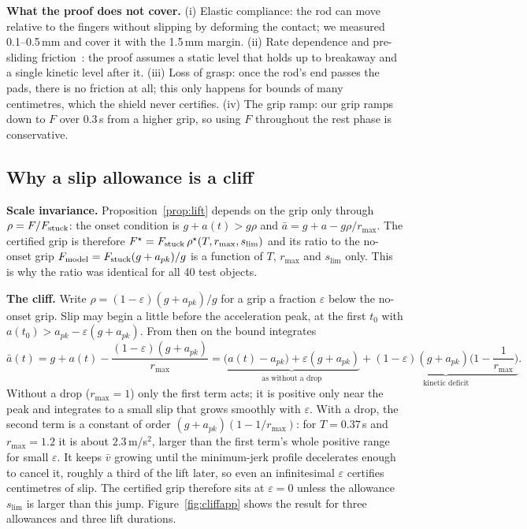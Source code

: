 \textbf{What the proof does not cover.} (i) Elastic compliance: the rod can move relative to the fingers without slipping
by deforming the contact; we measured 0.1--0.5\,mm and cover it with the 1.5\,mm margin. (ii) Rate dependence and
pre-sliding friction~\cite{canudas1995}: the proof assumes a static level that holds up to breakaway and a single kinetic
level after it. (iii) Loss of grasp: once the rod's end passes the pads, there is no friction at all; this only happens for
bounds of many centimetres, which the shield never certifies. (iv) The grip ramp: our grip ramps down to $F$ over 0.3\,s
from a higher grip, so using $F$ throughout the rest phase is conservative.

\subsection{Why a slip allowance is a cliff}\label{app:cliff}
\textbf{Scale invariance.} Proposition~\ref{prop:lift} depends on the grip only through $\rho=F/F_{\mathrm{stuck}}$: the onset condition is
$g+a(t)>g\rho$ and $\bar a=g+a-g\rho/r_{\max}$. The certified grip is therefore $F^\star=F_{\mathrm{stuck}}\,\rho^\star(T,r_{\max},s_{\lim})$
and its ratio to the no-onset grip $F_{\rm model}=F_{\mathrm{stuck}}(g+a_{pk})/g$ is a function of $T$, $r_{\max}$ and $s_{\lim}$ only. This
is why the ratio was identical for all 40 test objects.

\textbf{The cliff.} Write $\rho=(1-\varepsilon)(g+a_{pk})/g$ for a grip a fraction $\varepsilon$ below the no-onset grip.
Slip may begin a little before the acceleration peak, at the first $t_0$ with $a(t_0)>a_{pk}-\varepsilon(g+a_{pk})$. From
then on the bound integrates
\begin{equation}
\bar a(t)=g+a(t)-\frac{(1-\varepsilon)(g+a_{pk})}{r_{\max}}
=\underbrace{\big(a(t)-a_{pk}\big)+\varepsilon(g+a_{pk})}_{\text{as without a drop}}+\underbrace{(1-\varepsilon)(g+a_{pk})\Big(1-\frac1{r_{\max}}\Big)}_{\text{kinetic deficit}} .
\end{equation}
Without a drop ($r_{\max}=1$) only the first term acts; it is positive only near the peak and integrates to a small slip
that grows smoothly with $\varepsilon$. With a drop, the second term is a constant of order $(g+a_{pk})(1-1/r_{\max})$: for
$T=0.37$\,s and $r_{\max}=1.2$ it is about $2.3$\,m/s$^2$, larger than the first term's whole positive range for small
$\varepsilon$. It keeps $\bar v$ growing until the minimum-jerk profile decelerates enough to cancel it, roughly a third of
the lift later, so even an infinitesimal $\varepsilon$ certifies centimetres of slip. The certified grip therefore sits at
$\varepsilon=0$ unless the allowance $s_{\lim}$ is larger than this jump. Figure~\ref{fig:cliffapp} shows the result for
three allowances and three lift durations.

